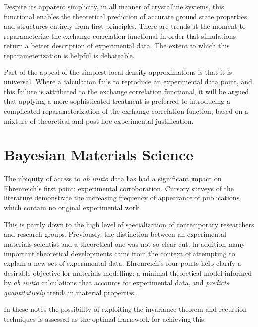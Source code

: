 Despite its apparent simplicity, in all manner of crystalline systems, 
this functional enables the theoretical
prediction of accurate ground state properties and structures entirely from first principles. 
There are trends at the moment to reparameterize the exchange-correlation functional
in order that simulations return a better description of experimental data. The extent
to which this reparameterization is helpful is debateable. 

Part of the appeal of the simplest local density approximations is that it is universal. 
Where a calculation fails to reproduce an experimental data point, and this failure is attributed to the
exchange correlation functional, it will be argued that applying a more sophisticated treatment
is preferred to introducing a complicated reparameterization of the exchange correlation
function, based on a mixture of theoretical and post hoc experimental justification.

\section{Bayesian Materials Science}
The ubiquity of access to {\it ab initio} data has had a significant impact on 
Ehrenreich's first point: experimental corroboration. 
Cursory surveys of the literature demonstrate the increasing frequency of 
appearance of publications which contain no original experimental work. 

This is partly down to the high level of specialization of contemporary 
researchers and research groups. Previously, the distinction between
an experimental materials scientist and a theoretical one was not so clear cut. 
In addition many important theoretical developments came 
from the context of attempting to explain a new set of experimental data.
Ehrenreich's four points help clarify a desirable objective for materials modelling:
a minimal theoretical model informed by {\it ab initio} calculations that accounts for 
experimental data, and {\it predicts quantitatively} trends in material properties. 

In these notes the possibility of exploiting the invariance theorem 
and recursion techniques is assessed as the optimal framework
for achieving this. 

